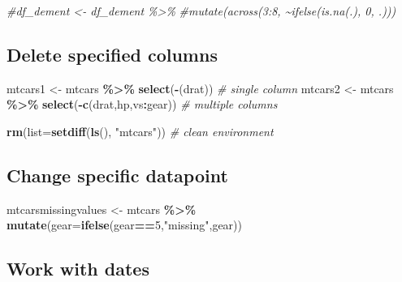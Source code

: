 \documentclass[
]{article}
\newenvironment{Shaded}{\begin{snugshade}}{\end{snugshade}}
\newcommand{\AttributeTok}[1]{\textcolor[rgb]{0.13,0.29,0.53}{#1}}
\newcommand{\CommentTok}[1]{\textcolor[rgb]{0.56,0.35,0.01}{\textit{#1}}}
\newcommand{\DecValTok}[1]{\textcolor[rgb]{0.00,0.00,0.81}{#1}}
\newcommand{\FunctionTok}[1]{\textcolor[rgb]{0.13,0.29,0.53}{\textbf{#1}}}
\newcommand{\NormalTok}[1]{#1}
\newcommand{\OtherTok}[1]{\textcolor[rgb]{0.56,0.35,0.01}{#1}}
\newcommand{\SpecialCharTok}[1]{\textcolor[rgb]{0.81,0.36,0.00}{\textbf{#1}}}
\newcommand{\StringTok}[1]{\textcolor[rgb]{0.31,0.60,0.02}{#1}}
\begin{document}
\begin{Shaded}
\begin{Highlighting}[]
\CommentTok{\#df\_dement \textless{}{-} df\_dement \%\textgreater{}\%}
  \CommentTok{\#mutate(across(3:8, \textasciitilde{}ifelse(is.na(.), 0, .)))}
\end{Highlighting}
\end{Shaded}

\hypertarget{delete-specified-columns}{%
\subsection{Delete specified columns}\label{delete-specified-columns}}

\begin{Shaded}
\begin{Highlighting}[]
\NormalTok{mtcars1 }\OtherTok{\textless{}{-}}\NormalTok{ mtcars }\SpecialCharTok{\%\textgreater{}\%} \FunctionTok{select}\NormalTok{(}\SpecialCharTok{{-}}\NormalTok{(drat)) }\CommentTok{\# single column}
\NormalTok{mtcars2 }\OtherTok{\textless{}{-}}\NormalTok{ mtcars }\SpecialCharTok{\%\textgreater{}\%} \FunctionTok{select}\NormalTok{(}\SpecialCharTok{{-}}\FunctionTok{c}\NormalTok{(drat,hp,vs}\SpecialCharTok{:}\NormalTok{gear)) }\CommentTok{\# multiple columns}

\FunctionTok{rm}\NormalTok{(}\AttributeTok{list=}\FunctionTok{setdiff}\NormalTok{(}\FunctionTok{ls}\NormalTok{(), }\StringTok{"mtcars"}\NormalTok{)) }\CommentTok{\# clean environment}
\end{Highlighting}
\end{Shaded}

\hypertarget{change-specific-datapoint}{%
\subsection{Change specific datapoint}\label{change-specific-datapoint}}

\begin{Shaded}
\begin{Highlighting}[]
\NormalTok{mtcarsmissingvalues }\OtherTok{\textless{}{-}}\NormalTok{ mtcars }\SpecialCharTok{\%\textgreater{}\%} \FunctionTok{mutate}\NormalTok{(}\AttributeTok{gear=}\FunctionTok{ifelse}\NormalTok{(gear}\SpecialCharTok{==}\DecValTok{5}\NormalTok{,}\StringTok{"missing"}\NormalTok{,gear))}
\end{Highlighting}
\end{Shaded}

\hypertarget{work-with-dates}{%
\subsection{Work with dates}\label{work-with-dates}}
\end{document}
